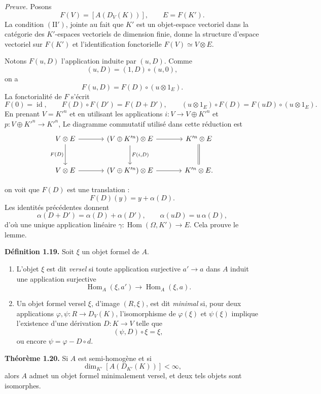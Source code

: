 \documentclass[11pt]{article}
\providecommand{\Hom}{\operatorname{Hom}}
\begin{document}
\emph{Preuve.} Posons
\[
 F(V)=[A(D_V(K))],\qquad E=F(K').
\]
La condition \((\mathrm{II}')\), jointe au fait que \(K'\) est un objet-espace vectoriel dans
la cat\'egorie des \(K'\)-espaces vectoriels de dimension finie, donne la structure d'espace
vectoriel sur \(F(K')\) et l'identification fonctorielle \(F(V)\simeq V\otimes E\).

Notons \(F(u,D)\) l'application induite par \((u,D)\). Comme
\[
 (u,D)=(1,D)\circ(u,0),
\]
on a
\[
 F(u,D)=F(D)\circ(u\otimes 1_E).
\]
La fonctorialit\'e de \(F\) s'\'ecrit
\[
 F(0)=\operatorname{id},\qquad
 F(D)\circ F(D')=F(D+D'),\qquad
 (u\otimes 1_E)\circ F(D)=F(uD)\circ(u\otimes 1_E).
\]
En prenant \(V=K'^n\) et en utilisant les applications \(i:V\to V\oplus K'^n\) et
\(p:V\oplus K'^n\to K'^n\), 
Le diagramme commutatif utilis\'e dans cette r\'eduction est
\[
\begin{tikzcd}[column sep=large,row sep=large]
V\otimes E \arrow[r] \arrow[d,"F(D)"'] &
(V\oplus K'^n)\otimes E \arrow[r] \arrow[d,"{F(i,D)}"] &
K'^n\otimes E \arrow[d,equal]\\
V\otimes E \arrow[r] &
(V\oplus K'^n)\otimes E \arrow[r] &
K'^n\otimes E .
\end{tikzcd}
\]

 on voit que \(F(D)\) est une translation :
\[
 F(D)(y)=y+\alpha(D).
\]
Les identit\'es pr\'ec\'edentes donnent
\[
 \alpha(D+D')=\alpha(D)+\alpha(D'),\qquad
 \alpha(uD)=u\,\alpha(D),
\]
d'o\`u une unique application lin\'eaire
\(\gamma:\Hom(\Omega,K')\to E\). Cela prouve le lemme.

\textbf{D\'efinition 1.19.} Soit \(\xi\) un objet formel de \(A\).

\begin{enumerate}[label=(\arabic*)]
\item L'objet \(\xi\) est dit \emph{versel} si toute application surjective \(a'\to a\) dans \(A\)
induit une application surjective
\[
 \Hom_A(\xi,a')\longrightarrow \Hom_A(\xi,a).
\]
\item Un objet formel versel \(\xi\), d'image \((R,\xi)\), est dit \emph{minimal} si,
pour deux applications \(\varphi,\psi:R\to D_V(K)\), l'isomorphisme de
\(\varphi(\xi)\) et \(\psi(\xi)\) implique l'existence d'une d\'erivation \(D:K\to V\)
telle que
\[
 (\psi,D)\circ \xi=\xi,
\]
ou encore \(\psi=\varphi-D\circ d\).
\end{enumerate}

\textbf{Th\'eor\`eme 1.20.} Si \(A\) est semi-homog\`ene et si
\[
 \dim_{K'}[A(D_{K'}(K))]<\infty,
\]
alors \(A\) admet un objet formel minimalement versel, et deux tels objets sont
isomorphes.
\end{document}
